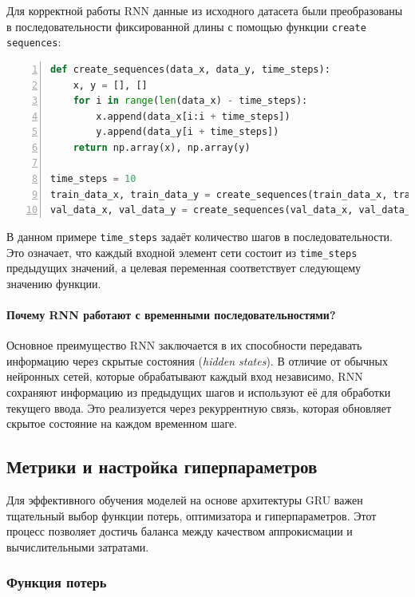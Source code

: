 Для корректной работы RNN данные из исходного датасета были преобразованы в последовательности фиксированной длины с помощью функции \texttt{create sequences}:

\begin{lstlisting}[language=Python, breaklines, caption=Создание временных последовательностей,numbers=left]
def create_sequences(data_x, data_y, time_steps):
    x, y = [], []
    for i in range(len(data_x) - time_steps):
        x.append(data_x[i:i + time_steps])
        y.append(data_y[i + time_steps])
    return np.array(x), np.array(y)

time_steps = 10
train_data_x, train_data_y = create_sequences(train_data_x, train_data_y, time_steps)
val_data_x, val_data_y = create_sequences(val_data_x, val_data_y, time_steps)
\end{lstlisting}

В данном примере \texttt{time\_steps} задаёт количество шагов в последовательности. Это означает, что каждый входной элемент сети состоит из \texttt{time\_steps} предыдущих значений, а целевая переменная соответствует следующему значению функции.

\paragraph{Почему RNN работают с временными последовательностями?}
Основное преимущество RNN заключается в их способности передавать информацию через скрытые состояния (\textit{hidden states}). В отличие от обычных нейронных сетей, которые обрабатывают каждый вход независимо, RNN сохраняют информацию из предыдущих шагов и используют её для обработки текущего ввода. Это реализуется через рекуррентную связь, которая обновляет скрытое состояние на каждом временном шаге.



\subsection{Метрики и настройка гиперпараметров}
\label{subsec:metrics}

Для эффективного обучения моделей на основе архитектуры GRU важен тщательный выбор функции потерь, оптимизатора и гиперпараметров. Этот процесс позволяет достичь баланса между качеством аппрокисмации и вычислительными затратами.

\subsubsection{Функция потерь}

